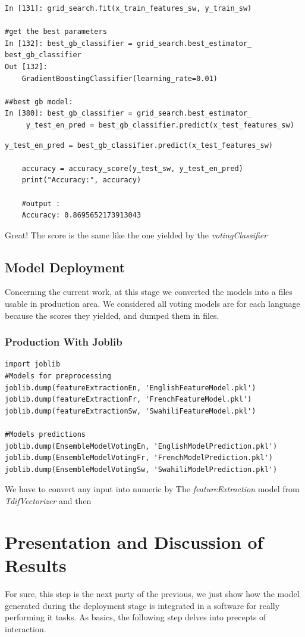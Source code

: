 \documentclass[12pt,a4paper, oneside]{book}
\begin{document}
\begin{lstlisting}[style=stylejupyter]
In [131]: grid_search.fit(x_train_features_sw, y_train_sw) 

#get the best parameters 
In [132]: best_gb_classifier = grid_search.best_estimator_ 
best_gb_classifier
Out [132]: 
	GradientBoostingClassifier(learning_rate=0.01) 
	
##best gb model:
In [380]: best_gb_classifier = grid_search.best_estimator_ 
     y_test_en_pred = best_gb_classifier.predict(x_test_features_sw)
\end{lstlisting} 

\begin{lstlisting}[style=stylejupyter]
	y_test_en_pred = best_gb_classifier.predict(x_test_features_sw)
	
	accuracy = accuracy_score(y_test_sw, y_test_en_pred)
	print("Accuracy:", accuracy) 
	
	#output : 
	Accuracy: 0.8695652173913043
\end{lstlisting}
Great! The score is the same like the one yielded by the \textit{votingClassifier}  

\subsection{Model Deployment}
Concerning the current work, at this stage we converted the models into a files usable in production area. We considered all voting models are for each language because the scores they yielded, and dumped them in files.
\subsubsection{Production With Joblib}
\begin{lstlisting}[style=stylejupyter]
import joblib
#Models for preprocessing
joblib.dump(featureExtractionEn, 'EnglishFeatureModel.pkl')
joblib.dump(featureExtractionFr, 'FrenchFeatureModel.pkl')
joblib.dump(featureExtractionSw, 'SwahiliFeatureModel.pkl') 

#Models predictions
joblib.dump(EnsembleModelVotingEn, 'EnglishModelPrediction.pkl')
joblib.dump(EnsembleModelVotingFr, 'FrenchModelPrediction.pkl')
joblib.dump(EnsembleModelVotingSw, 'SwahiliModelPrediction.pkl')
\end{lstlisting} 
We have to convert any input into numeric by The \textit{featureExtraction} model from \textit{TdifVectorizer} and then 


\section{Presentation and Discussion of Results} 
For sure, this step is the next party of the previous, we just show how the model generated during the deployment stage is integrated in a software for really performing it tasks. As basics, the following step delves into precepts of interaction. 
\end{document}
